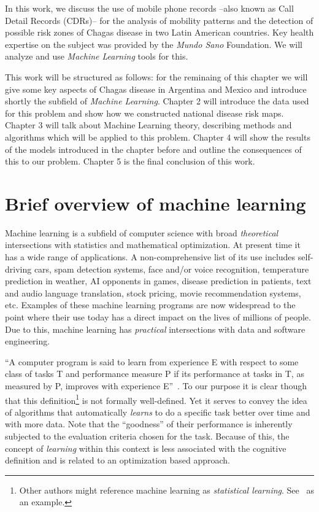 In this work, we discuss the use of mobile phone records --also known as Call Detail Records (CDRs)-- for the analysis of mobility patterns and the detection of possible risk zones of Chagas disease in two Latin American countries. Key health expertise on the subject was provided by the \textit{Mundo Sano} Foundation. We will analyze and use  \textit{Machine Learning} tools for this.

This work will be structured as follows: for the reminaing of this chapter we will give some key aspects of Chagas disease in Argentina and Mexico and introduce shortly the subfield of \textit{Machine Learning}. Chapter 2 will introduce the data used for this problem and show how we constructed national disease risk maps. Chapter 3 will talk about Machine Learning theory, describing methods and algorithms which will be applied to this problem. Chapter 4 will show the results of the models introduced in the chapter before and outline the consequences of this to our problem. Chapter 5 is the final conclusion of this work.


\section{Brief overview of machine learning}

Machine learning is a subfield of computer science with broad \textit{theoretical} intersections with statistics and mathematical optimization. At present time it has a wide range of applications. A non-comprehensive list of its use includes self-driving cars, spam detection systems, face and/or voice recognition, temperature prediction in weather, AI opponents in games, disease prediction in patients, text and audio language translation, stock pricing, movie recommendation systems, etc. Examples of these machine learning programs are now widespread to the point where their use today has a direct impact on the lives of millions of people. Due to this, machine learning has \textit{practical} intersections with data and software engineering.

``A computer program is said to learn from experience E with respect to some class of tasks T and performance measure P if its performance at tasks in T, as measured by P, improves with experience E''~\textcite{Mitchell-MLearning}. To our purpose it is clear though that this definition\footnote{Other authors might reference machine learning as \textit{statistical learning}. See~\textcite{hastie-elemstatslearn} as an example.} is not formally well-defined. Yet it serves to convey the idea of algorithms that automatically \textit{learns} to do a specific task better over time and with more data. Note that the ``goodness'' of their performance is inherently subjected to the evaluation criteria chosen for the task. Because of this, the concept of \textit{learning} within this context is less associated with the cognitive definition and is related to an optimization based approach.

